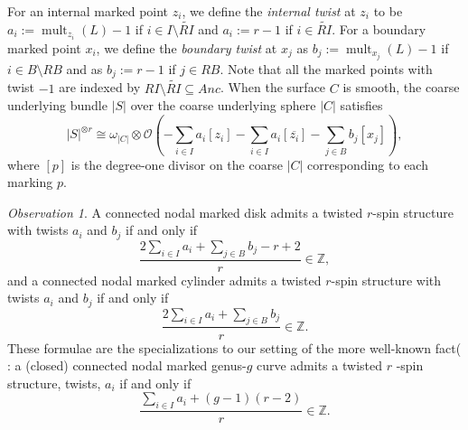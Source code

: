 \documentclass[11pt]{amsart}
\theoremstyle{definition}
\theoremstyle{remark}
\newtheorem{obs}[dummy]{Observation}
\newcommand{\<}{\left<}
\renewcommand{\>}{\right>}
\numberwithin{equation}{section}
\begin{document}
For an internal marked point $z_i$, we define the  \textit{internal twist} at $z_i$ to be $a_i:=\operatorname{mult}_{z_i}(L)-1$ if $i\in I\setminus \widetilde{RI}$
and $a_i:=r-1$ if $i\in \widetilde{RI}$. For a boundary marked point $x_i$, we define the  \textit{boundary twist} at $x_j$ as $b_j:=\operatorname{mult}_{x_j}(L)-1$ if $i\in B\setminus {RB}$ and as $b_j:=r-1$ if $j\in {RB}$. Note that all the marked points with twist $-1$ are indexed by $RI\setminus \widetilde{RI}\subseteq Anc$. When the surface $C$ is smooth, the coarse underlying bundle $|S|$ over the coarse underlying sphere $|C|$ %
satisfies
$$|S|^{\otimes r} \cong \omega_{|C|} \otimes {\mathcal{O}}\left(-\sum_{i \in I} a_i [z_i] - \sum_{i \in I} a_i [\overline{z_i}] - \sum_{j \in B} b_j[x_j]\right),$$
where $[p]$ %
is the degree-one divisor on the coarse $|C|$ corresponding to each marking $p$.


\begin{obs}
\label{obs rank open}
A connected nodal marked disk admits a twisted $r$-spin structure with twists $a_i$ and $b_j$ if and only if
\begin{equation}\label{eq mod r condition g=0}
\frac{2\sum_{i \in I} a_i + \sum_{j\in B} b_j -r+2}{r}\in \mathbb Z,
\end{equation}
and a connected nodal marked cylinder admits a twisted $r$-spin structure with twists $a_i$ and $b_j$ if and only if
\begin{equation}\label{eq mod r condition rk g=1}
\frac{2\sum_{i \in I} a_i + \sum_{j\in B} b_j}{r}\in \mathbb Z.
\end{equation}
These formulae are the specializations to our setting of the more %
well-known fact( \cite{Witten93}: a %
(closed) connected nodal marked genus-$g$ curve admits a twisted $r$%
-spin structure, twists, $a_i$ %
if and only if 
\begin{equation}\label{eq rank close}
\frac{\sum_{i\in I} a_i +(g-1)(r-2)}{r}\in {\mathbb{Z}}.
\end{equation}
\end{obs}
\end{document}
